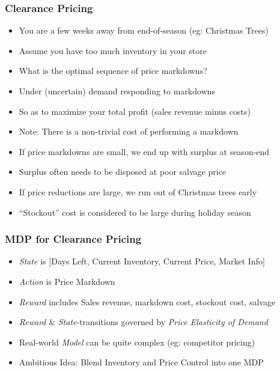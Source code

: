 \documentclass[handout]{beamer}
\begin{document}
\begin{frame}
\frametitle{Clearance Pricing}
\pause
\begin{itemize}[<+->]
\item You are a few weeks away from end-of-season (eg: Christmas Trees)
\item Assume you have too much inventory in your store
\item What is the optimal sequence of price markdowns?
\item Under (uncertain) demand responding to markdowns
\item So as to maximize your total profit (sales revenue minus costs)
\item Note: There is a non-trivial cost of performing a markdown
\item If price markdowns are small, we end up with surplus at season-end
\item Surplus often needs to be disposed at poor salvage price
\item If price reductions are large, we run out of Christmas trees early
\item ``Stockout'' cost is considered to be large during holiday season
\end{itemize}
\end{frame}

\begin{frame}
\frametitle{MDP for Clearance Pricing}
\pause
\begin{itemize}
\item {\em State} is [Days Left, Current Inventory, Current Price, Market Info]
\item {\em Action} is Price Markdown
\item {\em Reward} includes Sales revenue, markdown cost, stockout cost, salvage
\item {\em Reward} \& {\em State}-transitions governed by {\em Price Elasticity of Demand}
\item Real-world {\em Model} can be quite complex (eg: competitor pricing)
\item Ambitious Idea: Blend Inventory and Price Control into one MDP
\end{itemize}
\end{frame}
\end{document}
